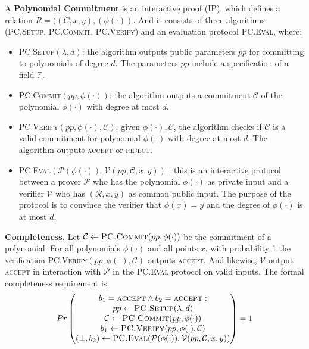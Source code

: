 \begin{definition}
A \textbf{Polynomial Commitment} is an interactive proof (IP), which defines a relation $R = ((C, x, y), (\phi(\cdot))$. 
And it consists of three algorithms (\textsc{PC.Setup}, \textsc{PC.Commit}, \textsc{PC.Verify}) and an evaluation protocol \textsc{PC.Eval}, where:

\begin{itemize}
    \item \textsc{PC.Setup}$(\lambda, d)$: the algorithm outputs public parameters $pp$ for committing to polynomials of degree $d$. The parameters $pp$ include a specification of a field $\mathbb{F}$.
    
    \item \textsc{PC.Commit}$(pp, \phi(\cdot))$: the algorithm outputs a commitment $\mathcal{C}$ of the polynomial $\phi(\cdot)$ with degree at most $d$.
    
    \item \textsc{PC.Verify}$(pp, \phi(\cdot), \mathcal{C})$: given $\phi(\cdot), \mathcal{C}$, the algorithm checks if $\mathcal{C}$ is a valid commitment for polynomial $\phi(\cdot)$  with degree at most $d$. The algorithm outputs \textsc{accept} or \textsc{reject}.
    
    \item \textsc{PC.Eval}$(\mathcal{P}(\phi(\cdot)), \mathcal{V}(pp, \mathcal{C}, x, y))$ : this is an  interactive protocol between a prover $\mathcal{P}$ who has the polynomial $\phi(\cdot)$ as private input and a verifier $\mathcal{V}$ who has $(\mathcal{R}, x, y)$ as common public input. The purpose of the protocol is to convince the verifier that $\phi(x) = y$ and the degree of $\phi(\cdot)$ is at most $d$.
\end{itemize}

\end{definition}

\textbf{Completeness.} Let $\mathcal{C} \leftarrow \textsc{PC.Commit}(pp, \phi(\cdot))$ be the commitment of a polynomial. 
For all polynomials $\phi(\cdot)$ and all points $x$, with probability 1 the verification \textsc{PC.Verify}$(pp, \phi(\cdot), \mathcal{C})$ outputs \textsc{accept}. And likewise, $\mathcal{V}$ output \textsc{accept} in interaction with $\mathcal{P}$ in the \textsc{PC.Eval} protocol on valid inputs. The formal completeness requirement is:
$$
Pr
\begin{pmatrix}
 b_1 = \textsc{accept} \wedge b_2 = \textsc{accept}: \\
 pp \leftarrow \textsc{PC.Setup}(\lambda, d) \\
 \mathcal{C} \leftarrow \textsc{PC.Commit}(pp, \phi(\cdot)) \\
 b_1 \leftarrow \textsc{PC.Verify}(pp, \phi(\cdot), \mathcal{C}) \\
 (\perp, b_2)\leftarrow \textsc{PC.Eval}(\mathcal{P}(\phi(\cdot)), \mathcal{V}(pp, \mathcal{C}, x, y))
\end{pmatrix}
= 1
$$


